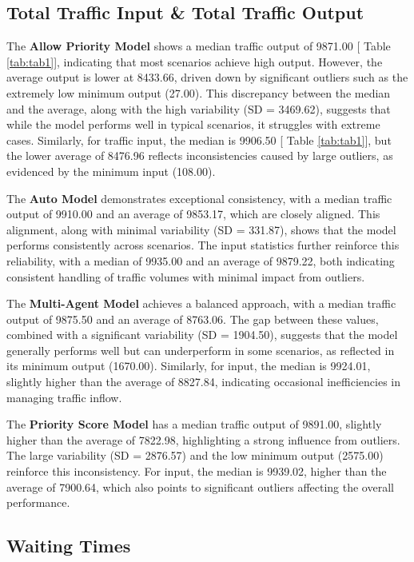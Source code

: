 \documentclass[sigconf]{acmart}
\begin{document}
\subsection{Total Traffic Input \& Total Traffic Output}

The \textbf{Allow Priority Model} shows a median traffic output of 9871.00 [ Table \ref{tab:tab1}], indicating that most scenarios achieve high output. However, the average output is lower at 8433.66, driven down by significant outliers such as the extremely low minimum output (27.00). This discrepancy between the median and the average, along with the high variability (SD = 3469.62), suggests that while the model performs well in typical scenarios, it struggles with extreme cases. Similarly, for traffic input, the median is 9906.50 [ Table \ref{tab:tab1}], but the lower average of 8476.96 reflects inconsistencies caused by large outliers, as evidenced by the minimum input (108.00).

The \textbf{Auto Model} demonstrates exceptional consistency, with a median traffic output of 9910.00 and an average of 9853.17, which are closely aligned. This alignment, along with minimal variability (SD = 331.87), shows that the model performs consistently across scenarios. The input statistics further reinforce this reliability, with a median of 9935.00 and an average of 9879.22, both indicating consistent handling of traffic volumes with minimal impact from outliers.

The \textbf{Multi-Agent Model} achieves a balanced approach, with a median traffic output of 9875.50 and an average of 8763.06. The gap between these values, combined with a significant variability (SD = 1904.50), suggests that the model generally performs well but can underperform in some scenarios, as reflected in its minimum output (1670.00). Similarly, for input, the median is 9924.01, slightly higher than the average of 8827.84, indicating occasional inefficiencies in managing traffic inflow.

The \textbf{Priority Score Model} has a median traffic output of 9891.00, slightly higher than the average of 7822.98, highlighting a strong influence from outliers. The large variability (SD = 2876.57) and the low minimum output (2575.00) reinforce this inconsistency. For input, the median is 9939.02, higher than the average of 7900.64, which also points to significant outliers affecting the overall performance.

\subsection{Waiting Times}
\end{document}
